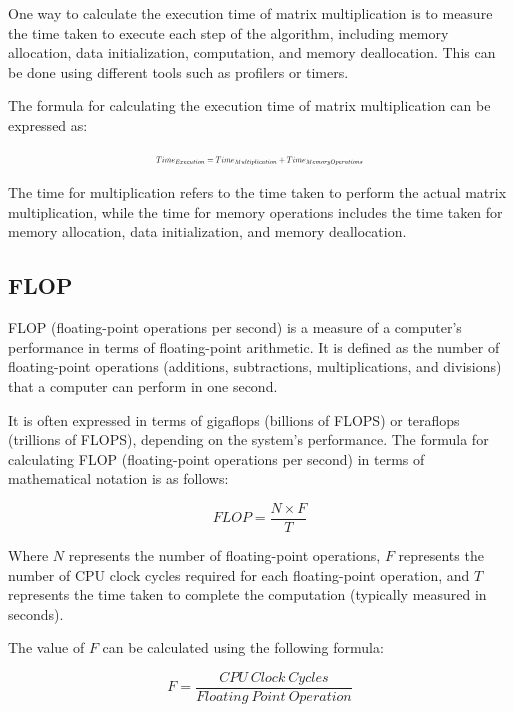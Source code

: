 \documentclass[conference]{IEEEtran}
\begin{document}
	One way to calculate the execution time of matrix multiplication is to measure the time taken to execute each step of the algorithm, including memory allocation, data initialization, computation, and memory deallocation. This can be done using different tools such as profilers or timers.
	
	The formula for calculating the execution time of matrix multiplication can be expressed as:
	
	\begin{equation}
		\resizebox{0.44\textwidth}{!}{
			$Time_{Execution} = Time_{Multiplication} + Time_{MemoryOperations}$
		}
	\end{equation}
	
	
	The time for multiplication refers to the time taken to perform the actual matrix multiplication, while the time for memory operations includes the time taken for memory allocation, data initialization, and memory deallocation.
	
	\subsection{FLOP} 
	
	FLOP (floating-point operations per second) is a measure of a computer's performance in terms of floating-point arithmetic. It is defined as the number of floating-point operations (additions, subtractions, multiplications, and divisions) that a computer can perform in one second.
	
	It is often expressed in terms of gigaflops (billions of FLOPS) or teraflops (trillions of FLOPS), depending on the system's performance. The formula for calculating FLOP (floating-point operations per second) in terms of mathematical notation is as follows:
	
	\begin{equation}
		FLOP = \frac{N \times F}{T}
	\end{equation}
	
	
	Where $N$ represents the number of floating-point operations, $F$ represents the number of CPU clock cycles required for each floating-point operation, and $T$ represents the time taken to complete the computation (typically measured in seconds).
	
	The value of $F$ can be calculated using the following formula:
	
	\begin{equation}
		F = \frac{CPU \ Clock \ Cycles}{Floating \ Point \ Operation}
	\end{equation}
	
\end{document}
